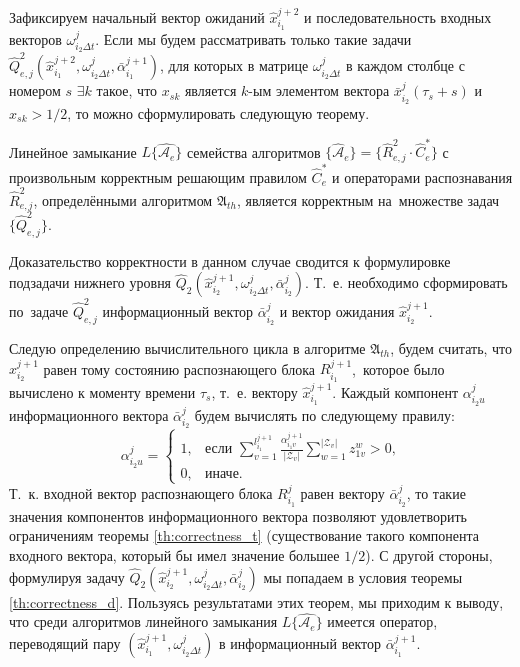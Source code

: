 Зафиксируем начальный вектор ожиданий $\hat x_{i_1}^{j+2}$ и последовательность входных векторов $\omega_{i_2\Delta{t}}^j$. Если мы будем рассматривать только такие задачи $\hat Q_{e,j}^2(\hat x_{i_1}^{j+2},\omega_{i_2\Delta{t}}^j,\bar\alpha_{i_1}^{j+1})$, для которых в матрице $\omega_{i_2\Delta{t}}^j$ в каждом столбце с номером $s$ ${\exists}k$ такое, что $x_{sk}$ является $k$-ым элементом вектора $\bar x_{i_2}^j(\tau_s+s)$ и $x_{sk}>1/2$, то можно сформулировать следующую теорему.
		
\begin{Theorem}
	Линейное замыкание $L\{\hat{\mathcal A_e}\}$ семейства алгоритмов $\{\hat{\mathcal A}_e\}=\{\hat R_{e,j}^2\cdot\hat C_e^*\}$ с произвольным корректным решающим правилом $\hat C_e^*$ и операторами распознавания $\hat R_{e,j}^2$, определёнными алгоритмом $\mathfrak A_{th}$, является корректным на~множестве задач $\{\hat Q_{e,j}^2\}$.
\end{Theorem}

\begin{Proof}
	Доказательство корректности в данном случае сводится к формулировке подзадачи нижнего уровня $\hat Q_2(\hat x_{i_2}^{j+1},\omega_{i_2\Delta t}^j,\bar\alpha_{i_2}^j)$. Т.~е. необходимо сформировать по~задаче $\hat Q_{e,j}^2$ информационный вектор $\bar\alpha_{i_2}^j$ и вектор ожидания $\hat x_{i_2}^{j+1}$.
	
	Следую определению вычислительного цикла в алгоритме $\mathfrak A_{th}$, будем считать, что $\hat x_{i_2}^{j+1}$ равен тому состоянию распознающего блока $R_{i_1}^{j+1}$,~которое было вычислено к моменту времени $\tau_s$, т.~е. вектору $\hat x_{i_1}^{j+1}$. Каждый компонент $\alpha_{i_2u}^j$ информационного вектора $\bar\alpha_{i_2}^j$ будем вычислять по следующему правилу:
	\begin{equation}
		\alpha_{i_2u}^j=\begin{cases}
			1, & \text{если $\sum\limits_{v=1}^{l_{i_1}^{j+1}}\frac{\alpha_{i_1v}^{j+1}}{|\mathcal{Z}_v|}\sum\limits_{w=1}^{|\mathcal{Z}_v|}z_{1v}^w>0$,}\\
			
			0, & \text{иначе.}
		\end{cases}
	\end{equation}
	Т.~к. входной вектор распознающего блока $R_{i_1}^j$ равен вектору $\bar\alpha_{i_2}^j$, то такие значения компонентов информационного вектора позволяют удовлетворить ограничениям теоремы \ref{th:correctness_t} (существование такого компонента входного вектора, который бы имел значение большее $1/2$). С другой стороны, формулируя задачу $\hat Q_2(\hat x_{i_2}^{j+1},\omega_{i_2\Delta t}^j,\bar\alpha_{i_2}^j)$ мы попадаем в условия теоремы \ref{th:correctness_d}. Пользуясь результатами этих теорем, мы приходим к выводу, что среди алгоритмов линейного замыкания $L\{\hat{\mathcal A_e}\}$ имеется оператор, переводящий пару $(\hat x_{i_1}^{j+1},\omega_{i_2\Delta t}^j)$ в информационный вектор $\bar\alpha_{i_1}^{j+1}$.
\end{Proof}

